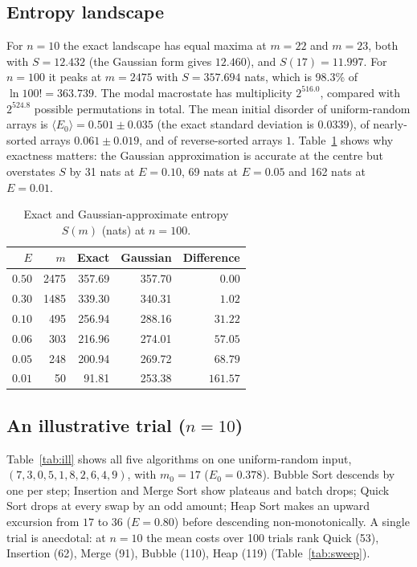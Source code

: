 \documentclass[10pt,journal]{IEEEtran}
\begin{document}
\subsection{Entropy landscape}
\label{sec:res-entropy}
For $n=10$ the exact landscape has equal maxima at $m=22$ and $m=23$, both with $S=12.432$ (the Gaussian form gives $12.460$), and $S(17)=11.997$. For $n=100$ it peaks at $m=2475$ with $S=357.694$ nats, which is 98.3\% of $\ln 100!=363.739$. The modal macrostate has multiplicity $2^{516.0}$, compared with $2^{524.8}$ possible permutations in total. The mean initial disorder of uniform-random arrays is $\langle E_0\rangle=0.501\pm0.035$ (the exact standard deviation is $0.0339$), of nearly-sorted arrays $0.061\pm0.019$, and of reverse-sorted arrays $1$. Table~\ref{tab:entropy} shows why exactness matters: the Gaussian approximation is accurate at the centre but overstates $S$ by 31 nats at $E=0.10$, 69 nats at $E=0.05$ and 162 nats at $E=0.01$.

\begin{table}[!t]
\centering
\caption{Exact and Gaussian-approximate entropy $S(m)$ (nats) at $n=100$.}
\label{tab:entropy}
\footnotesize
\setlength{\tabcolsep}{5pt}
\begin{tabular}{@{}rrrrr@{}}
\toprule
$E$ & $m$ & Exact & Gaussian & Difference \\
\midrule
$0.50$ & 2475 & 357.69 & 357.70 & $0.00$ \\
$0.30$ & 1485 & 339.30 & 340.31 & $1.02$ \\
$0.10$ & 495 & 256.94 & 288.16 & $31.22$ \\
$0.06$ & 303 & 216.96 & 274.01 & $57.05$ \\
$0.05$ & 248 & 200.94 & 269.72 & $68.79$ \\
$0.01$ & 50 & 91.81 & 253.38 & $161.57$ \\
\bottomrule
\end{tabular}
\end{table}

\subsection{An illustrative trial ($n=10$)}
Table~\ref{tab:ill} shows all five algorithms on one uniform-random input, $(7,3,0,5,1,8,2,6,4,9)$, with $m_0=17$ ($E_0=0.378$). Bubble Sort descends by one per step; Insertion and Merge Sort show plateaus and batch drops; Quick Sort drops at every swap by an odd amount; Heap Sort makes an upward excursion from $17$ to $36$ ($E=0.80$) before descending non-monotonically. A single trial is anecdotal: at $n=10$ the mean costs over 100 trials rank Quick (53), Insertion (62), Merge (91), Bubble (110), Heap (119) (Table~\ref{tab:sweep}).
\end{document}
